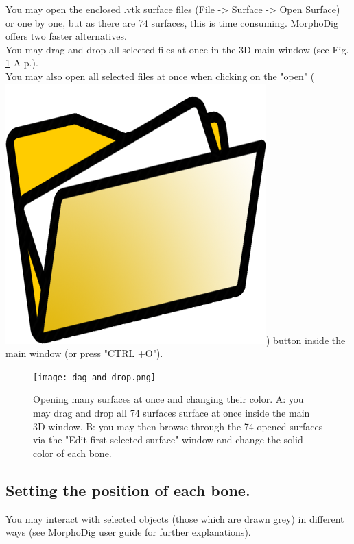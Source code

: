 \documentclass[12pt, a4paper]{book}
\begin{document}
	You may open the enclosed .vtk surface files (File -> Surface -> Open Surface) or one by one, but as there are 74 surfaces, this is time consuming. MorphoDig offers two faster alternatives.\\
You may drag and drop all selected files at once in the 3D main window (see Fig. \ref{drag_and_drop}-A p.\pageref{drag_and_drop}).\\
You may also open all selected files at once when clicking on the "open" (\includegraphics[scale=0.03]{../images/03/open_data.png}) button inside the main window (or press "CTRL +O").\\

\begin{figure}
  \centering
  \texttt{[image: dag\_and\_drop.png]} 
	\caption{Opening many surfaces at once and changing their color.  A: you may drag and drop all 74 surfaces surface at once inside the main 3D window.  B: you may then browse through the 74 opened surfaces via the "Edit first selected surface" window and change the solid color of each bone.}
\label{drag_and_drop}
 
\end{figure}


\subsection{Setting the position of each bone.}

You may interact with selected objects (those which are drawn grey) in different ways (see MorphoDig user guide for further explanations).\\
\end{document}
